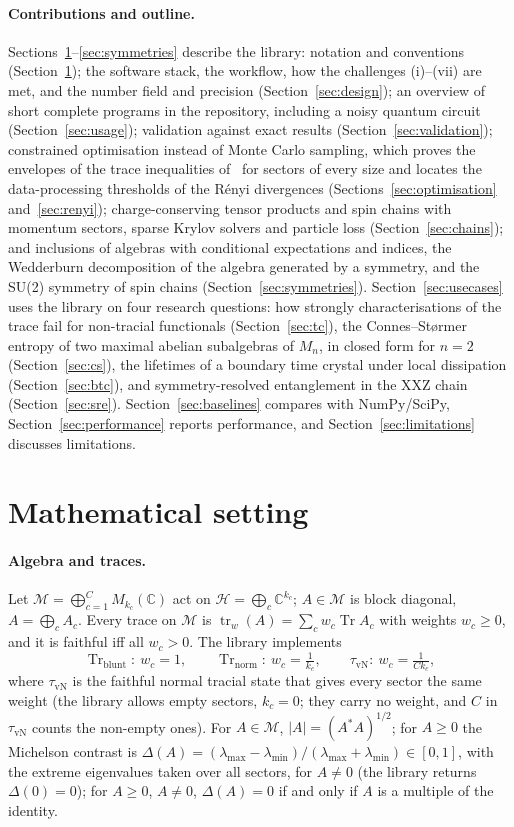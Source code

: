 \documentclass[11pt]{article}
\DeclareMathOperator{\Tr}{Tr}
\newcommand{\C}{\mathbb{C}}
\newcommand{\M}{\mathcal{M}}
\begin{document}
\paragraph{Contributions and outline.} Sections~\ref{sec:math}--\ref{sec:symmetries} describe the library:
notation and conventions (Section~\ref{sec:math}); the software stack, the workflow, how the challenges (i)--(vii) are
met, and the number field and precision (Section~\ref{sec:design}); an overview of short complete programs in the
repository, including a noisy quantum circuit (Section~\ref{sec:usage}); validation against exact results (Section~\ref{sec:validation}); constrained
optimisation instead of Monte Carlo sampling, which proves the envelopes of the trace inequalities of~\cite{v1} for
sectors of every size and locates the data-processing thresholds of the Rényi divergences (Sections~\ref{sec:optimisation}
and~\ref{sec:renyi}); charge-conserving tensor products and spin chains with momentum sectors, sparse Krylov solvers
and particle loss (Section~\ref{sec:chains}); and inclusions of algebras with conditional expectations and indices, the
Wedderburn decomposition of the algebra generated by a symmetry, and the SU(2) symmetry of spin chains
(Section~\ref{sec:symmetries}). Section~\ref{sec:usecases} uses the library on four research questions: how strongly
characterisations of the trace fail for non-tracial functionals (Section~\ref{sec:tc}), the Connes--St{\o}rmer entropy
of two maximal abelian subalgebras of $M_n$, in closed form for $n=2$ (Section~\ref{sec:cs}), the lifetimes of a
boundary time crystal under local dissipation (Section~\ref{sec:btc}), and symmetry-resolved entanglement in the XXZ
chain (Section~\ref{sec:sre}). Section~\ref{sec:baselines} compares with NumPy/SciPy, Section~\ref{sec:performance}
reports performance, and Section~\ref{sec:limitations} discusses limitations.

\section{Mathematical setting}\label{sec:math}

\paragraph{Algebra and traces.} Let $\M=\bigoplus_{c=1}^C M_{k_c}(\C)$ act on
$\mathcal H=\bigoplus_c\C^{k_c}$; $A\in\M$ is block diagonal, $A=\bigoplus_c A_c$. Every trace on $\M$ is
$\operatorname{tr}_w(A)=\sum_c w_c\Tr A_c$ with weights $w_c\ge0$, and it is faithful iff all $w_c>0$. The library implements
\[
  \Tr_{\mathrm{blunt}}:\ w_c=1,\qquad \Tr_{\mathrm{norm}}:\ w_c=\tfrac1{k_c},\qquad
  \tau_{\mathrm{vN}}:\ w_c=\tfrac1{Ck_c},
\]
where $\tau_{\mathrm{vN}}$ is the faithful normal tracial state that gives every sector the same weight
(the library allows empty sectors, $k_c=0$; they carry no weight, and $C$ in $\tau_{\mathrm{vN}}$ counts the non-empty ones).
For $A\in\M$, $|A|=(A^*A)^{1/2}$; for $A\ge 0$ the Michelson contrast is
$\Delta(A)=(\lambda_{\max}-\lambda_{\min})/(\lambda_{\max}+\lambda_{\min})\in[0,1]$, with the extreme
eigenvalues taken over all sectors, for $A\ne0$ (the library returns $\Delta(0)=0$); for $A\ge0$, $A\ne0$, $\Delta(A)=0$ if and only if $A$ is a multiple of the identity.
\end{document}
